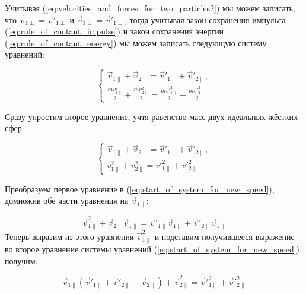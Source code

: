 \documentclass{article}
\begin{document}
Учитывая (\ref{eq:velocities_and_forces_for_two_particles2}) мы можем записать, что $ \vec{v}_{1\perp} = \vec{v}'_{1\perp} $ и $ \vec{v}_{1\perp} = \vec{v}'_{1\perp} $, тогда учитывая закон сохранения импульса (\ref{eq:rule_of_contant_impulse}) и закон сохранения энергии (\ref{eq:rule_of_contant_energy}) мы можем записать следующую систему уравнений:

\begin{equation}
    \begin{cases}
        \vec{v}_{1\parallel} + \vec{v}_{2\parallel} = \vec{v}'_{1\parallel} + \vec{v}'_{2\parallel},
        \\
        \displaystyle\frac{mv^2_{1\parallel}}{2} + \displaystyle\frac{mv^2_{2\parallel}}{2} = \displaystyle\frac{mv'^2_{1\parallel}}{2} + \displaystyle\frac{mv'^2_{2\parallel}}{2}
    \end{cases}
\end{equation}

Сразу упростим второе уравнение, учтя равенство масс двух идеальных жёстких сфер:

\begin{equation}\label{eq:start_of_system_for_new_speed}
    \begin{cases}
        \vec{v}_{1\parallel} + \vec{v}_{2\parallel} = \vec{v}'_{1\parallel} + \vec{v}'_{2\parallel},
        \\
        v^2_{1\parallel} + v^2_{2\parallel} = v'^2_{1\parallel} + v'^2_{2\parallel}
    \end{cases}
\end{equation}

Преобразуем первое уравнение в (\ref{eq:start_of_system_for_new_speed}), домножив обе части уравнения на $ \vec{v}_{1\parallel} $:

\begin{equation}
    \vec{v}^2_{1\parallel} + \vec{v}_{2\parallel}\vec{v}_{1\parallel} = \vec{v}'_{1\parallel}\vec{v}_{1\parallel} + \vec{v}'_{2\parallel}\vec{v}_{1\parallel}
\end{equation}
Теперь выразим из этого уравнения $ \vec{v}^2_{1\parallel} $ и подставим получившееся выражение во второе уравнение системы уравнений (\ref{eq:start_of_system_for_new_speed}), получим:

\begin{equation}
    \vec{v}_{1\parallel}(\vec{v}'_{1\parallel} + \vec{v}'_{2\parallel} - \vec{v}_{2\parallel}) + \vec{v}^2_{2\parallel} = \vec{v}'^2_{1\parallel} + \vec{v}'^2_{2\parallel}
\end{equation}
\end{document}
